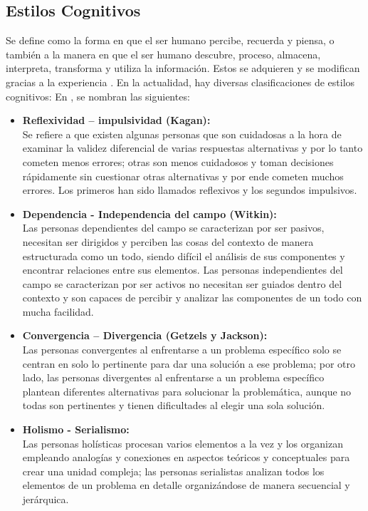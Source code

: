 \subsection{Estilos Cognitivos}
\label{sec:estilosCognitivos}

Se define como la forma en que el ser humano percibe, recuerda y piensa, o también a la manera en que el ser humano descubre, proceso, almacena, interpreta, transforma y utiliza la información. Estos se adquieren y se modifican gracias a la experiencia \cite{Velez2013}. En la actualidad, hay diversas clasificaciones de estilos cognitivos:  
En \cite{Garcia1989}, se nombran las siguientes:
\begin{itemize}
    \item \textbf{Reflexividad – impulsividad (Kagan):}\ \\
Se refiere a que existen algunas personas que son cuidadosas a la hora de examinar la validez diferencial de varias respuestas alternativas y por lo tanto cometen menos errores; otras son menos cuidadosos y toman decisiones rápidamente sin cuestionar otras alternativas y por ende cometen muchos errores. Los primeros han sido llamados reflexivos y los segundos impulsivos. 

\item \textbf{Dependencia - Independencia del campo (Witkin):}\ \\
Las personas dependientes del campo se caracterizan por ser pasivos, necesitan ser dirigidos y perciben las cosas del contexto de manera estructurada como un todo, siendo difícil el análisis de sus componentes y encontrar relaciones entre sus elementos. Las personas independientes del campo se caracterizan por ser activos no necesitan ser guiados dentro del contexto y son capaces de percibir y analizar las componentes de un todo con mucha facilidad. 

\item \textbf{Convergencia – Divergencia (Getzels y Jackson):}\ \\
Las personas convergentes al enfrentarse a un problema específico solo se centran en solo lo pertinente para dar una solución a ese problema; por otro lado, las personas divergentes al enfrentarse a un problema específico plantean diferentes alternativas para solucionar la problemática, aunque no todas son pertinentes y tienen dificultades al elegir una sola solución.

\item \textbf{Holismo - Serialismo: }\ \\
Las personas holísticas procesan varios elementos a la vez y los organizan empleando analogías y conexiones en aspectos teóricos y conceptuales para crear una unidad compleja; las personas serialistas analizan todos los elementos de un problema en detalle organizándose de manera secuencial y jerárquica.
\end{itemize}


